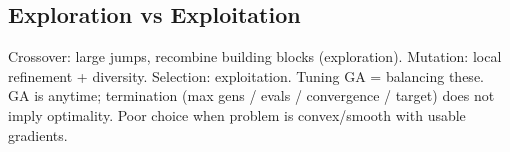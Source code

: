 \subsection*{Exploration vs Exploitation}
Crossover: large jumps, recombine building blocks (exploration). Mutation: local refinement + diversity. Selection: exploitation. Tuning GA = balancing these.\\
GA is anytime; termination (max gens / evals / convergence / target) does not imply optimality. Poor choice when problem is convex/smooth with usable gradients.
